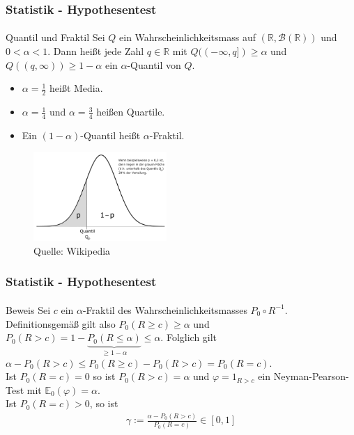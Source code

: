 \documentclass{beamer}
\begin{document}
\begin{frame}
    \frametitle{Statistik - Hypothesentest}
\framesubtitle{}
\begin{block}{Quantil und Fraktil}
Sei $Q$ ein Wahrscheinlichkeitsmass auf $(\mathbb{R}, \mathcal{B}(\mathbb{R}) )$ und $0 < \alpha <1$. Dann heißt jede Zahl $q \in \mathbb{R}$ mit $Q((-\infty, q ]) \geq \alpha$ und  $Q((q, \infty )) \geq 1- \alpha$  ein $\alpha$-Quantil von $Q$.
\begin {itemize}
\item $\alpha = \frac{1}{2}$ heißt Media.
\item $\alpha = \frac{1}{4}$ und  $\alpha = \frac{3}{4}$ heißen Quartile.
\item Ein $(1-\alpha)$-Quantil heißt $\alpha$-Fraktil. 
\end{itemize}
\end{block}

\begin{figure}[htp]
      \centering
    \includegraphics[width=0.45\textwidth]{img/Quantil}
      \caption{Quelle: Wikipedia}
\end{figure}

 \end{frame}


\begin{frame}
    \frametitle{Statistik - Hypothesentest}
\framesubtitle{}
\begin{block}{Beweis}
Sei $c$ ein $\alpha$-Fraktil des Wahrscheinlichkeitsmasses $P_0 \circ R^{-1}$. Definitionsgemäß gilt also $P_0(R \geq c) \geq \alpha$ und $P_0 (R > c) = 1 - \underbrace{P_0(R \leq \alpha)}_{\geq 1 - \alpha} \leq \alpha$. Folglich gilt
$\alpha - P_0(R >c) \leq P_0(R \geq c) - P_0(R > c) = P_0(R = c) $. \\
Ist $ P_0(R = c)  = 0$ so ist $ P_0(R >c) = \alpha$ und $\varphi = 1_{R > c}$ ein Neyman-Pearson-Test mit $\mathbb{E}_0(\varphi) = \alpha$. 
\\ Ist $ P_0(R = c) > 0$, so ist
\begin{align*}
\gamma := \frac{\alpha - P_0(R > c)}{ P_0(R=c)} \in [0,1]
\end{align*}
\end{block}

 \end{frame}
\end{document}

